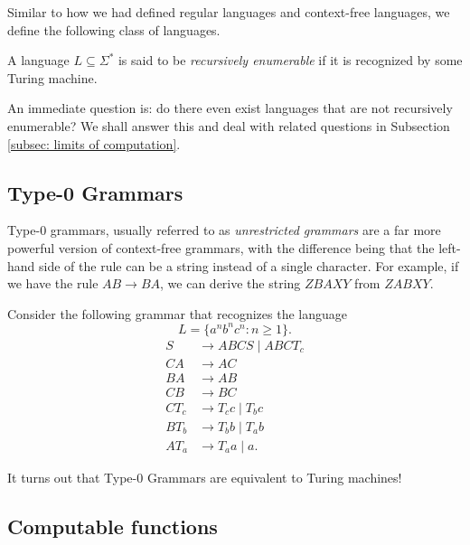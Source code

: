 	Similar to how we had defined regular languages and context-free languages, we define the following class of languages.

	\begin{fdef}
		A language $L \subseteq \Sigma^*$ is said to be \emph{recursively enumerable} if it is recognized by some Turing machine.
	\end{fdef}
	An immediate question is: do there even exist languages that are not recursively enumerable? We shall answer this and deal with related questions in Subsection \ref{subsec: limits of computation}.

\subsection{Type-\texorpdfstring{0}{$0$} Grammars}

	Type-$0$ grammars, usually referred to as \emph{unrestricted grammars} are a far more powerful version of context-free grammars, with the difference being that the left-hand side of the rule can be a string instead of a single character. For example, if we have the rule $AB \to BA$, we can derive the string $ZBAXY$ from $ZABXY$.

	Consider the following grammar that recognizes the language
	\[ L = \{ a^nb^nc^n : n \ge 1 \}. \]
	\begin{align*}
		S &\to ABCS \mid ABCT_c \\
		CA &\to AC \\
		BA &\to AB \\
		CB &\to BC \\
		CT_c &\to T_cc \mid T_bc \\
		BT_b &\to T_bb \mid T_ab \\
		AT_a &\to T_aa \mid a.
	\end{align*}

	It turns out that Type-$0$ Grammars are equivalent to Turing machines!\\

\subsection{Computable functions}
	
